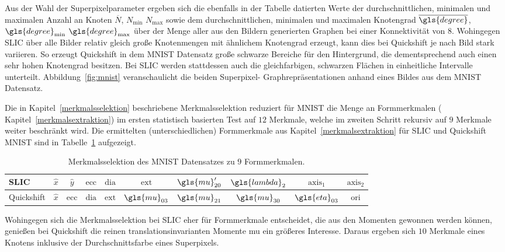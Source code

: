 Aus der Wahl der Superpixelparameter ergeben sich die ebenfalls in der Tabelle datierten Werte der durchschnittlichen, minimalen und maximalen Anzahl an Knoten $\overline{N}$, $N_{\min}$ \bzw{} $N_{\max}$ sowie dem durchschnittlichen, minimalen und maximalen Knotengrad $\overline{\gls{degree}}$, $\gls{degree}_{\min}$ \bzw{} $\gls{degree}_{\max}$ über der Menge aller aus den Bildern generierten Graphen bei einer Konnektivität von $8$.
Wohingegen \gls{SLIC} über alle Bilder relativ gleich große Knotenmengen mit ähnlichem Knotengrad erzeugt, kann dies bei Quickshift je nach Bild stark variieren.
So erzeugt Quickshift in dem \gls{MNIST} Datensatz \bspw{} große schwarze Bereiche für den Hintergrund, die dementsprechend auch einen sehr hohen Knotengrad besitzen.
Bei \gls{SLIC} werden stattdessen auch die gleichfarbigen, schwarzen Flächen in einheitliche Intervalle unterteilt.
Abbildung~\ref{fig:mnist} veranschaulicht die beiden Superpixel- \bzw{} Graphrepräsentationen anhand eines Bildes aus dem \gls{MNIST} Datensatz.


Die in Kapitel~\ref{merkmalsselektion} beschriebene Merkmalsselektion reduziert für \gls{MNIST} die Menge an Formmerkmalen (\vgl{} Kapitel~\ref{merkmalsextraktion}) im ersten statistisch basierten Test auf $12$ Merkmale, welche im zweiten Schritt rekursiv auf $9$ Merkmale weiter beschränkt wird.
Die ermittelten (unterschiedlichen) Formmerkmale aus Kapitel~\ref{merkmalsextraktion} für \gls{SLIC} und Quickshift \bzgl{} \gls{MNIST} sind in Tabelle~\ref{tab:mnist_merkmale} aufgezeigt.
\begin{table}[t]
\centering
\begin{tabular}{lccccccccc}
  \toprule
  \gls{SLIC} & $\hat{x}$ & $\hat{y}$ & $\mathrm{ecc}$ & $\mathrm{dia}$ & $\mathrm{ext}$ & $\gls{mu}^{\prime}_{20}$ & $\gls{lambda}_2$ & $\mathrm{axis}_1$ & $\mathrm{axis}_2$\\
  \midrule
  Quickshift & $\hat{x}$ & $\mathrm{ecc}$ & $\mathrm{dia}$ & $\mathrm{ext}$ & $\gls{mu}_{03}$ & $\gls{mu}_{21}$ & $\gls{mu}_{30}$ & $\gls{eta}_{03}$ & $\mathrm{ori}$\\
  \bottomrule
\end{tabular}
  \caption[\gls{MNIST} Merkmalsselektion]{Merkmalsselektion des \gls{MNIST} Datensatzes zu $9$ Formmerkmalen.}
\label{tab:mnist_merkmale}
\end{table}
Wohingegen sich die Merkmalsselektion bei \gls{SLIC} eher für Formmerkmale entscheidet, die aus den Momenten gewonnen werden können, genießen bei Quickshift die reinen translationsinvarianten Momente \gls{mu} ein größeres Interesse.
Daraus ergeben sich $10$ Merkmale eines Knotens inklusive der Durchschnittsfarbe eines Superpixels.

